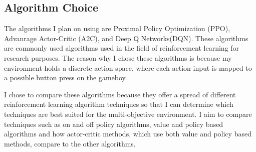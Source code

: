 \subsection{Algorithm Choice}

The algorithms I plan on using are Proximal Policy Optimization (PPO), Advanrage Actor-Critic (A2C), and Deep Q Networks(DQN). These algorithms are commonly used algorithms used in the field of reinforcement learning for research purposes. The reason why I chose these algorithms is because my environment holds a discrete action space, where each action input is mapped to a possible button press on the gameboy.

I chose to compare these algorithms because they offer a spread of different reinforcement learning algorithm techniques so that I can determine which techniques are best suited for the multi-objective environment. I aim to compare techniques such as on and off policy algorithms, value and policy based algorithms and how actor-critic methods, which use both value and policy based methods, compare to the other algorithms.